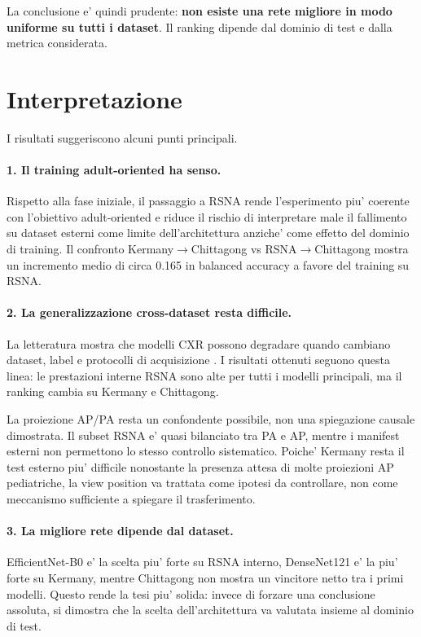 \documentclass[11pt,a4paper]{article}
\newcommand{\balacc}{balanced accuracy}
\begin{document}
La conclusione e' quindi prudente: \textbf{non esiste una rete migliore in modo
uniforme su tutti i dataset}. Il ranking dipende dal dominio di test e dalla
metrica considerata.

\section{Interpretazione}

I risultati suggeriscono alcuni punti principali.

\paragraph{1. Il training adult-oriented ha senso.}
Rispetto alla fase iniziale, il passaggio a RSNA rende l'esperimento piu'
coerente con l'obiettivo adult-oriented e riduce il rischio di interpretare male
il fallimento su dataset esterni come limite dell'architettura anziche' come
effetto del dominio di training. Il confronto Kermany$\rightarrow$Chittagong vs
RSNA$\rightarrow$Chittagong mostra un incremento medio di circa 0.165 in
\balacc{} a favore del training su RSNA.

\paragraph{2. La generalizzazione cross-dataset resta difficile.}
La letteratura mostra che modelli CXR possono degradare quando cambiano dataset,
label e protocolli di acquisizione \cite{cohen2020limits}. I risultati ottenuti
seguono questa linea: le prestazioni interne RSNA sono alte per tutti i modelli
principali, ma il ranking cambia su Kermany e Chittagong.

La proiezione AP/PA resta un confondente possibile, non una spiegazione causale
dimostrata. Il subset RSNA e' quasi bilanciato tra PA e AP, mentre i manifest
esterni non permettono lo stesso controllo sistematico. Poiche' Kermany resta il
test esterno piu' difficile nonostante la presenza attesa di molte proiezioni AP
pediatriche, la view position va trattata come ipotesi da controllare, non come
meccanismo sufficiente a spiegare il trasferimento.

\paragraph{3. La migliore rete dipende dal dataset.}
EfficientNet-B0 e' la scelta piu' forte su RSNA interno, DenseNet121 e' la piu'
forte su Kermany, mentre Chittagong non mostra un vincitore netto tra i primi
modelli. Questo rende la tesi piu' solida: invece di forzare una conclusione
assoluta, si dimostra che la scelta dell'architettura va valutata insieme al
dominio di test.
\end{document}
